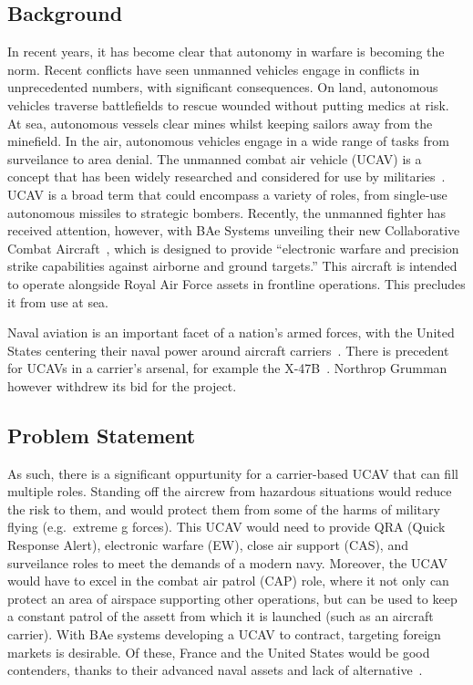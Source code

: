 \documentclass[../main.tex]{subfiles}
\begin{document}
\subsection{Background}
In recent years, it has become clear that autonomy in warfare is becoming the norm.
Recent conflicts have seen unmanned vehicles engage in conflicts in unprecedented numbers, with significant consequences.
On land, autonomous vehicles traverse battlefields to rescue wounded without putting medics at risk.
At sea, autonomous vessels clear mines whilst keeping sailors away from the minefield.
In the air, autonomous vehicles engage in a wide range of tasks from surveilance to area denial.
The unmanned combat air vehicle (UCAV) is a concept that has been widely researched and considered for use by militaries~\cite{UCAVRdE}.
UCAV is a broad term that could encompass a variety of roles, from single-use autonomous missiles to strategic bombers.
Recently, the unmanned fighter has received attention, however, with BAe Systems unveiling their new 
Collaborative Combat Aircraft~\cite{BAeSystems2026}, which is designed to provide ``electronic warfare and precision strike capabilities against airborne and ground targets.''
This aircraft is intended to operate alongside Royal Air Force assets in frontline operations.
This precludes it from use at sea.

Naval aviation is an important facet of a nation's armed forces, with the United States centering their naval power around aircraft carriers~\cite{UnitedStatesNavy2006}.
There is precedent for UCAVs in a carrier's arsenal, for example the X-47B~\cite{NorthropGrumman2015}.
Northrop Grumman however withdrew its bid for the project.

\subsection{Problem Statement}
As such, there is a significant oppurtunity for a carrier-based UCAV that can fill multiple roles.
Standing off the aircrew from hazardous situations would reduce the risk to them, and would protect them from some of the harms of military flying (e.g.\ extreme g forces).
This UCAV would need to provide QRA (Quick Response Alert), electronic warfare (EW), close air support (CAS), and surveilance roles to meet the demands of a modern navy.
Moreover, the UCAV would have to excel in the combat air patrol (CAP) role, where it not only can protect an area of airspace supporting other operations, but can be used to keep a constant patrol of the assett from which it is launched (such as an aircraft carrier).
With BAe systems developing a UCAV to contract, targeting foreign markets is desirable.
Of these, France and the United States would be good contenders, thanks to their advanced naval assets and lack of alternative~\cite{NorthropGrumman2015}.
\end{document}
